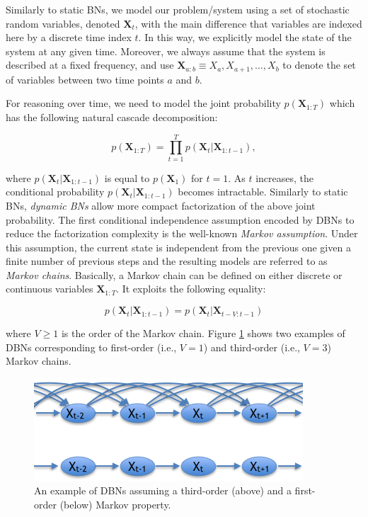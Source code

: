Similarly to static BNs, we model our problem/system using a set of stochastic random variables, denoted $\bm X_t$, with the main difference that variables are indexed here by a discrete time index $t$. In this way, we explicitly model the state of the system at any given time. Moreover, we always assume that the system is described at a fixed frequency, and use $\bm X_{a:b} \equiv X_a,X_{a+1},\ldots,X_{b}$ to denote the set of variables between two time points $a$ and $b$.  

For reasoning over time, we need to model the joint probability $p(\bm X_{1:T})$ which has the following natural cascade decomposition:

$$p(\bm X_{1:T})  = \prod_{t=1}^T p(\bm X_t|\bm X_{1:t-1}),$$

\noindent where $p(\bm X_t|\bm X_{1:t-1})$ is equal to $p(\bm X_1)$ for $t=1$. As $t$ increases, the conditional probability $p(\bm X_t|\bm X_{1:t-1})$ becomes intractable. Similarly to static BNs, \textit{dynamic BNs} allow more compact factorization of the above joint probability. The first conditional independence assumption encoded by DBNs to reduce the factorization complexity is the well-known \textit{Markov assumption}. Under this assumption, the current state is independent from the previous one given a finite number of previous steps and the resulting models are referred to as \textit{Markov chains}. Basically, a Markov chain can be defined on either discrete or continuous variables $\bm X_{1:T}$. It exploits the following equality:

$$p(\bm X_t| \bm X_{1:t-1})  = p(\bm X_t|\bm X_{t-V:t-1})$$

\noindent where $V\geq 1$ is the order of the Markov chain. Figure \ref{Figure:markovChain} shows two examples of DBNs corresponding to first-order (i.e., $V=1$) and third-order (i.e., $V=3$) Markov chains. 

\begin{figure}[ht!]
\begin{center}
\includegraphics[scale=0.56]{./figures/PreliminariesMarkovChain}
\caption{\label{Figure:markovChain} An example of DBNs assuming a third-order (above) and a first-order (below) Markov property.
}
\end{center}
\end{figure}

